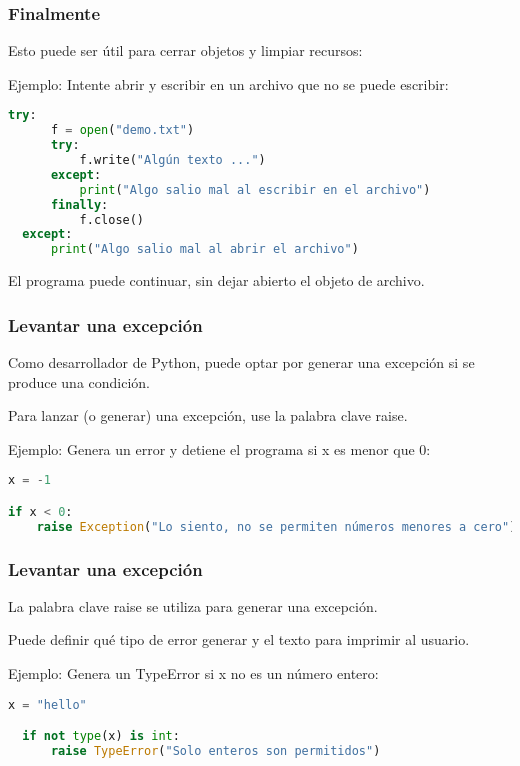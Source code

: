 \begin{frame}[fragile]
  \frametitle{Finalmente}

  Esto puede ser útil para cerrar objetos y limpiar recursos:

  \vspace{\baselineskip}
  Ejemplo: Intente abrir y escribir en un archivo que no se puede escribir:
  \begin{lstlisting}[language=Python]
  try:
      f = open("demo.txt")
      try:
          f.write("Algún texto ...")
      except:
          print("Algo salio mal al escribir en el archivo")
      finally:
          f.close()
  except:
      print("Algo salio mal al abrir el archivo")
  \end{lstlisting}

  \vspace{\baselineskip}
  El programa puede continuar, sin dejar abierto el objeto de archivo.
\end{frame}

\begin{frame}[fragile]
  \frametitle{Levantar una excepción}

  Como desarrollador de Python, puede optar por generar una excepción si
  se produce una condición.

  \vspace{\baselineskip}
  Para lanzar (o generar) una excepción, use la palabra clave
  \textcolor{codeKeyword}{raise}.

  \vspace{\baselineskip}
  Ejemplo: Genera un error y detiene el programa si x es menor que 0:
  \begin{lstlisting}[language=Python]
x = -1

if x < 0:
    raise Exception("Lo siento, no se permiten números menores a cero")
  \end{lstlisting}
\end{frame}

\begin{frame}[fragile]
  \frametitle{Levantar una excepción}

  La palabra clave \textcolor{codeKeyword}{raise} se utiliza para
  generar una excepción.

  \vspace{\baselineskip}
  Puede definir qué tipo de error generar y el texto para imprimir al usuario.

  \vspace{\baselineskip}
  Ejemplo: Genera un TypeError si x no es un número entero:
  \begin{lstlisting}[language=Python]
  x = "hello"

  if not type(x) is int:
      raise TypeError("Solo enteros son permitidos")
  \end{lstlisting}
\end{frame}

